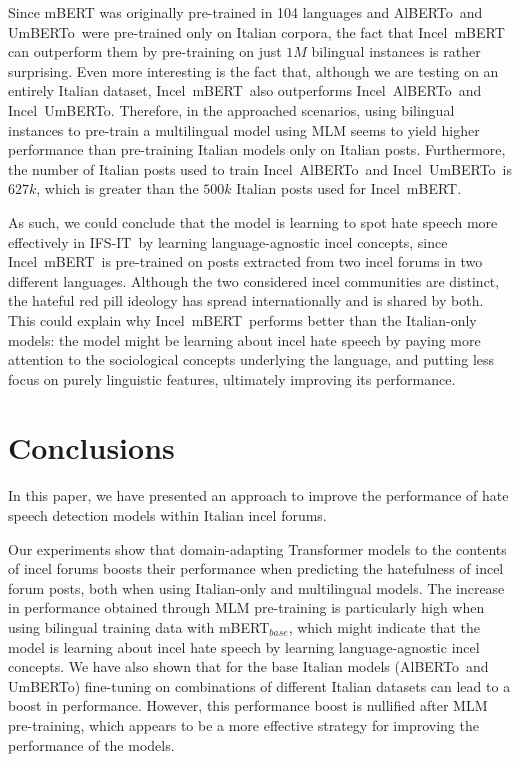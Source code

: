\documentclass[11pt]{article}
\newcommand{\dsITclassification}{IFS-IT}
\newcommand{\mbert}{\mbox{mBERT$_{base}$}}
\newcommand{\imbert}{\mbox{Incel mBERT}}
\newcommand{\umbert}{\mbox{UmBERTo}}
\newcommand{\albert}{\mbox{AlBERTo}}
\newcommand{\iumbert}{\mbox{Incel UmBERTo}}
\newcommand{\ialbert}{\mbox{Incel AlBERTo}}
\begin{document}
Since mBERT was originally pre-trained in 104 languages and \albert\, and \umbert\, were pre-trained only on Italian corpora, the fact that \imbert\, can outperform them by pre-training on just $1M$ bilingual instances is rather surprising. Even more interesting is the fact that, although we are testing on an entirely Italian dataset, \imbert\, also outperforms \ialbert\, and \iumbert. Therefore, in the approached scenarios, using bilingual instances to pre-train a multilingual model using MLM seems to yield higher performance than pre-training Italian models only on Italian posts. Furthermore, the number of Italian posts used to train \ialbert\, and \iumbert\, is $627k$, which is greater than the $500k$ Italian posts used for \imbert.

As such, we could conclude that the model is learning to spot hate speech more effectively in \dsITclassification\, by learning language-agnostic incel concepts, since \imbert\, is pre-trained on posts extracted from two incel forums in two different languages. Although the two considered incel communities are distinct, the hateful red pill ideology has spread internationally and is shared by both. This could explain why \imbert\, performs better than the Italian-only models: the model might be learning about incel hate speech by paying more attention to the sociological concepts underlying the language, and putting less focus on purely linguistic features, ultimately improving its performance.


\section{Conclusions}

In this paper, we have presented an approach to improve the performance of hate speech detection models within Italian incel forums.

Our experiments show that domain-adapting Transformer models to the contents of incel forums boosts their performance when predicting the hatefulness of incel forum posts, both when using Italian-only and multilingual models. The increase in performance obtained through MLM pre-training is particularly high when using bilingual training data with \mbert, which might indicate that the model is learning about incel hate speech by learning language-agnostic incel concepts.
We have also shown that for the base Italian models (\albert\, and \umbert) fine-tuning on combinations of different Italian datasets can lead to a boost in performance. However, this performance boost is nullified after MLM pre-training, which appears to be a more effective strategy for improving the performance of the models.
\end{document}

